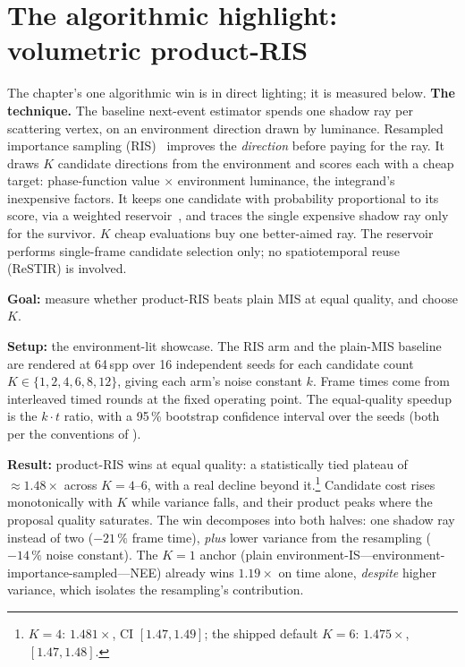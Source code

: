 \section{The algorithmic highlight: volumetric product-RIS}
\label{sec:ris}

The chapter's one algorithmic win is in direct lighting; it is measured below.
\textbf{The technique.} The baseline next-event estimator spends
one shadow ray per scattering vertex, on an environment direction drawn by luminance. Resampled
importance sampling (RIS)~\cite{Talbot2005} improves the \emph{direction} before paying for the ray.
It draws $K$ candidate directions from the environment and scores each with a cheap target:
phase-function value $\times$ environment luminance, the integrand's inexpensive factors. It keeps
one candidate with probability proportional to its score, via a weighted
reservoir~\cite{Bitterli2020}, and traces the
single expensive shadow ray only for the survivor. $K$ cheap evaluations buy one
better-aimed ray. The reservoir performs single-frame candidate selection only; no
spatiotemporal reuse (ReSTIR) is involved.

\textbf{Goal:} measure whether product-RIS beats plain MIS at equal quality, and choose $K$.

\textbf{Setup:} the environment-lit showcase. The RIS arm and the plain-MIS baseline are
rendered at \num{64}\,spp over \num{16} independent seeds for each candidate count
$K\in\{1,2,4,6,8,12\}$, giving each arm's noise constant $k$. Frame times come from interleaved timed
rounds at the fixed operating point. The equal-quality speedup is the $k\cdot t$ ratio, with a
\num{95}\,\% bootstrap confidence interval over the seeds (both per the conventions of
).

\textbf{Result:} product-RIS wins at equal quality: a statistically tied plateau of
$\mathbf{{\approx}1.48\times}$ across $K=4$--$6$, with a real decline beyond
it.\footnote{$K{=}4$: $1.481\times$, CI $[1.47, 1.49]$; the shipped default $K{=}6$:
$1.475\times$, $[1.47, 1.48]$.} Candidate cost rises
monotonically with $K$ while variance falls, and their product peaks where the proposal quality
saturates. The win decomposes into both halves: one shadow ray instead of two ($-21\,\%$ frame time),
\emph{plus} lower variance from the resampling ($-14\,\%$ noise constant). The $K{=}1$ anchor (plain environment-IS---environment-importance-sampled---NEE) already wins $1.19\times$ on time alone, \emph{despite} higher variance, which
isolates the resampling's contribution.

